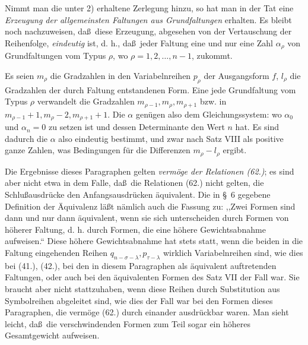 Nimmt man die unter 2) erhaltene Zerlegung hinzu, so hat man in der Tat eine \emph{Erzeugung der allgemeinsten Faltungen aus Grundfaltungen} erhalten. Es bleibt noch nachzuweisen, da\ss\ diese Erzeugung, abgesehen von der Vertauschung der Reihenfolge, \emph{eindeutig} ist, d. h., da\ss\ jeder Faltung eine und nur eine Zahl $\alpha_\rho$ von Grundfaltungen vom Typus $\rho$, wo $\rho=1,2,\ldots,n-1$, zukommt.

Es seien $m_\rho$ die Gradzahlen in den Variabelnreihen $p_\rho$ der Ausgangsform $f$, $l_\rho$ die Gradzahlen der durch Faltung entstandenen Form. Eine jede Grundfaltung vom Typus $\rho$ verwandelt die Gradzahlen $m_{\rho-1},m_\rho,m_{\rho+1}$ bzw. in $m_{\rho-1}+1,m_\rho-2,m_{\rho+1}+1$. Die $\alpha$ gen\"ugen also dem Gleichungssystem:
wo $\alpha_0$ und $\alpha_n=0$ zu setzen ist und dessen Determinante den Wert $n$ hat. Es sind dadurch die $\alpha$ also eindeutig bestimmt, und zwar nach Satz VIII als positive ganze Zahlen, was Bedingungen f\"ur die Differenzen $m_\rho-l_\rho$ ergibt.

Die Ergebnisse dieses Paragraphen gelten \emph{verm\"oge der Relationen (62.)}; es sind aber nicht etwa in dem Falle, da\ss\ die Relationen (62.) nicht gelten, die Schlu\ss{}ausdr\"ucke den Anfangsausdr\"ucken \"aquivalent. Die in \S\ 6 gegebene Definition der \"Aquivalenz l\"a\ss t n\"amlich auch die Fassung zu: ,,Zwei Formen sind dann und nur dann \"aquivalent, wenn sie sich unterscheiden durch Formen von h\"oherer Faltung, d. h. durch Formen, die eine h\"ohere Gewichtsabnahme aufweisen.`` Diese h\"ohere Gewichtsabnahme hat stets statt, wenn die beiden in die Faltung eingehenden Reihen $q_{n-\sigma-\lambda},p_{\tau-\lambda}$ wirklich Variabelnreihen sind, wie dies bei (41.), (42.), bei den in diesem Paragraphen als \"aquivalent auftretenden Faltungen, oder auch bei den \"aquivalenten Formen des Satz VII der Fall war. Sie braucht aber nicht stattzuhaben, wenn diese Reihen durch Substitution aus Symbolreihen abgeleitet sind, wie dies der Fall war bei den Formen dieses Paragraphen, die verm\"oge (62.) durch einander ausdr\"uckbar waren. Man sieht leicht, da\ss\ die verschwindenden Formen zum Teil sogar ein h\"oheres Gesamtgewicht aufweisen.
